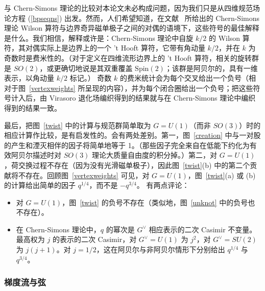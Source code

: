 与 Chern-Simons 理论的比较对本论文未必构成问题，因为我们只是从四维规范场论方程 (\ref{bpseqns}) 出发。然而，人们希望知道，在文献~\cite{fiveknots} 所给出的 Chern-Simons 理论 Wilson 算符与边界奇异磁单极子之间的对偶的语境下，这些符号的最佳解释是什么。我们相信，解释或许是：Chern-Simons 理论中自旋 $k/2$ 的 Wilson 算符，其对偶实际上是边界上的一个 't Hooft 算符，它带有角动量 $k/2$，并在 $k$ 为奇数时是费米性的。（对于定义在四维流形边界上的 't Hooft 算符，相关的旋转群是 $SO(2)$，或更确切地说是其双重覆盖 $\mathrm{Spin}(2)$；该群是阿贝尔的，具有一维表示，以角动量 $k/2$ 标记。）
奇数 $k$ 的费米统计会为每个交叉给出一个负号（相对于图~\ref{vertexweights} 所呈现的内容），并为每个闭合圈给出一个负号；把这些符号计入后，由 Virasoro 退化场编织得到的结果就与在 Chern-Simons 理论中编织得到的结果一致。

最后，把图~\ref{twist} 中的计算与规范群简单取为 $G=U(1)$（而非 $SO(3)$）时的相应计算作比较，是有启发性的。会有两处差别。第一，图~\ref{creation} 中与一对股的产生和湮灭相伴的因子将简单地等于 1。（那些因子完全来自在低能下约化为有效阿贝尔描述时对 $SO(3)$ 理论大质量自由度的积分掉。）第二，对 $G=U(1)$，荷交换过程不存在（因为没有光滑磁单极子），因此图~\ref{twist}(b) 中的第二个贡献将不存在。回顾图~\ref{vertexweights} 可见，对 $G=U(1)$，图~\ref{twist}(a) 或 (b) 的计算给出简单的因子 $q^{1/4}$，而不是 $-q^{3/4}$。
有两点评论：\begin{itemize}\item 对 $G=U(1)$，图~\ref{twist} 的负号不存在（类似地，图~\ref{unknot} 中的负号也不存在）。\item 在 Chern-Simons 理论中，$q$ 的幂次是 $G^\vee$ 相应表示的二次 Casimir 不变量。最高权为 $j$ 的表示的二次 Casimir，对 $G^\vee=U(1)$ 为 $j^2$，对 $G^\vee=SU(2)$ 为 $j(j+1)$。对 $j=1/2$，这在阿贝尔与非阿贝尔情形下分别给出 $q^{1/4}$ 与 $q^{3/4}$。\end{itemize}


\subsubsection{梯度流与弦}\label{morsestrings}


